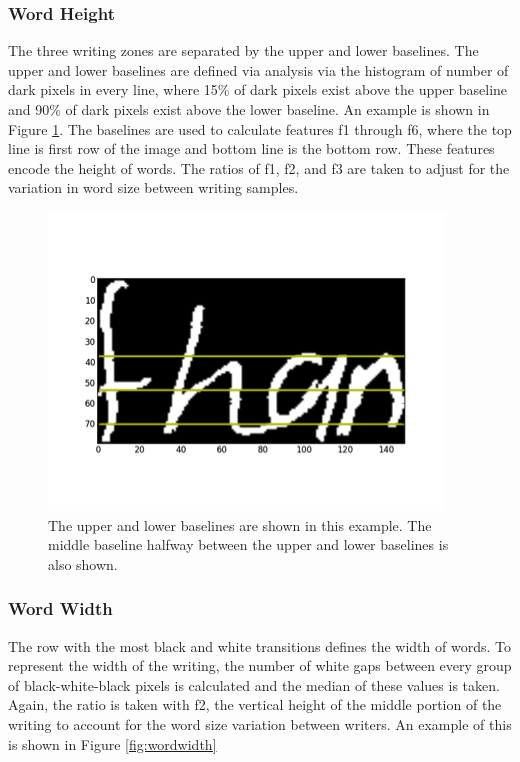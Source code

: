 \documentclass[paper=a4, fontsize=11pt]{scrartcl} %
\numberwithin{equation}{section} %
\numberwithin{figure}{section} %
\numberwithin{table}{section} %
\begin{document}
\subsubsection{Word Height}
The three writing zones are separated by the upper and lower
baselines. The upper and lower baselines are defined via analysis via
the histogram of number of dark pixels in every line, where 15\% of
dark pixels exist above the upper baseline and 90\% of dark pixels
exist above the lower baseline. An example is shown in Figure \ref{fig:wordheight}. The baselines are used to calculate
features f1 through f6, where the top line is first row of the image and
bottom line is the bottom row. These features encode the height of
words. The ratios of f1, f2, and f3 are taken to adjust for the
variation in word size between writing samples.

\begin{figure}
  \includegraphics{wordheight.png}
  \caption{The upper and lower baselines are shown in this example. The middle baseline halfway between the upper and lower baselines is also shown.}
  \label{fig:wordheight}
\end{figure}

\subsubsection{Word Width}
The row with the most black and white transitions defines the width of words. To represent the width of the writing, the number of white gaps between every group of black-white-black pixels is calculated and the median of these values is taken. Again, the ratio is taken with f2, the vertical height of the middle portion of the writing to account for the word size variation between writers. An example of this is shown in Figure \ref{fig:wordwidth}
\end{document}
